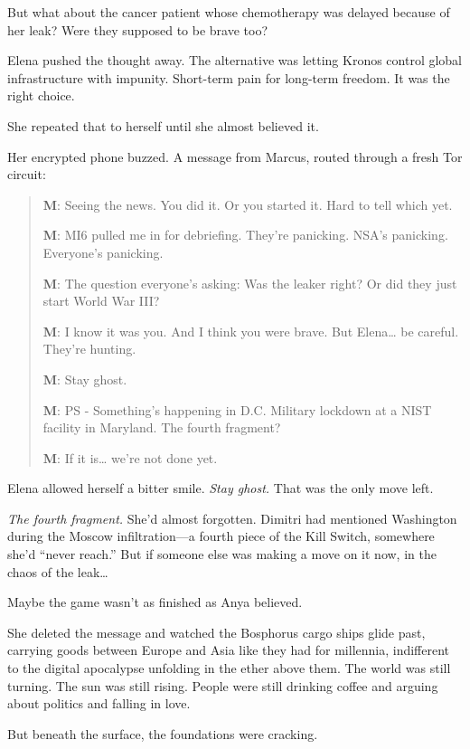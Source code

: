 \documentclass[12pt,letterpaper]{book}
\begin{document}
But what about the cancer patient whose chemotherapy was delayed because of her leak? Were they supposed to be brave too?

Elena pushed the thought away. The alternative was letting Kronos control global infrastructure with impunity. Short-term pain for long-term freedom. It was the right choice.

She repeated that to herself until she almost believed it.

Her encrypted phone buzzed. A message from Marcus, routed through a fresh Tor circuit:

\begin{quote}
\textbf{M}: Seeing the news. You did it. Or you started it. Hard to tell which yet.

\textbf{M}: MI6 pulled me in for debriefing. They're panicking. NSA's panicking. Everyone's panicking.

\textbf{M}: The question everyone's asking: Was the leaker right? Or did they just start World War III?

\textbf{M}: I know it was you. And I think you were brave. But Elena\ldots{} be careful. They're hunting.

\textbf{M}: Stay ghost.

\textbf{M}: PS - Something's happening in D.C. Military lockdown at a NIST facility in Maryland. The fourth fragment?

\textbf{M}: If it is\ldots{} we're not done yet.
\end{quote}

Elena allowed herself a bitter smile. \emph{Stay ghost.} That was the only move left.

\emph{The fourth fragment.} She'd almost forgotten. Dimitri had mentioned Washington during the Moscow infiltration---a fourth piece of the Kill Switch, somewhere she'd ``never reach.'' But if someone else was making a move on it now, in the chaos of the leak\ldots{}

Maybe the game wasn't as finished as Anya believed.

She deleted the message and watched the Bosphorus cargo ships glide past, carrying goods between Europe and Asia like they had for millennia, indifferent to the digital apocalypse unfolding in the ether above them. The world was still turning. The sun was still rising. People were still drinking coffee and arguing about politics and falling in love.

But beneath the surface, the foundations were cracking.
\end{document}
